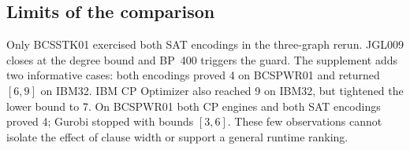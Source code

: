 \subsection{Limits of the comparison}
Only BCSSTK01 exercised both SAT encodings in the three-graph rerun.
JGL009 closes at the degree bound and BP~400 triggers the guard.
The supplement adds two informative cases: both encodings proved 4 on
BCSPWR01 and returned $[6,9]$ on IBM32. IBM CP Optimizer also reached 9 on IBM32, but tightened the lower
bound to 7. On BCSPWR01 both CP engines and both SAT encodings proved 4;
Gurobi stopped with bounds $[3,6]$. These few observations cannot
isolate the effect of clause width or support a general runtime ranking.
